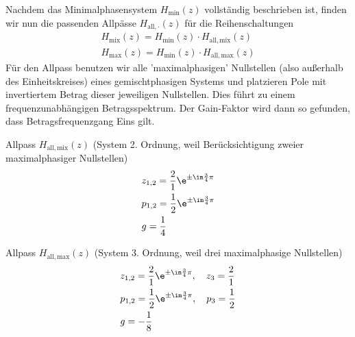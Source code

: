 \begin{ExCalc}
Nachdem das Minimalphasensystem $H_\mathrm{min}(z)$ vollständig beschrieben ist,
finden wir nun die
passenden Allpässe $H_\mathrm{all,\cdot}(z)$ für die Reihenschaltungen
\begin{align}
H_\mathrm{mix}(z) = H_\mathrm{min}(z) \cdot H_\mathrm{all,mix}(z)\\
H_\mathrm{max}(z) = H_\mathrm{min}(z) \cdot H_\mathrm{all,max}(z)
\end{align}
%
Für den Allpass benutzen wir alle 'maximalphasigen' Nullstellen (also außerhalb des
Einheitskreises) eines gemischtphasigen Systems und platzieren Pole mit invertiertem
Betrag dieser jeweiligen Nullstellen. Dies führt zu einem frequenzunabhängigen
Betragsspektrum. Der Gain-Faktor wird dann so gefunden, dass Betragsfrequenzgang
Eins gilt.
%

Allpass $H_\mathrm{all,mix}(z)$ (System 2. Ordnung, weil Berücksichtigung zweier
maximalphasiger Nullstellen)
\begin{align}
&z_{1,2} = \frac{2}{1} \e^{\pm\im\frac{3}{4}\pi}\\
&p_{1,2} = \frac{1}{2} \e^{\pm\im\frac{3}{4}\pi}\\
&g=\frac{1}{4}
\end{align}

Allpass $H_\mathrm{all,max}(z)$ (System 3. Ordnung, weil drei maximalphasige
Nullstellen)
\begin{align}
&z_{1,2} = \frac{2}{1} \e^{\pm\im\frac{3}{4}\pi},\quad z_3 = \frac{2}{1}\\
&p_{1,2} = \frac{1}{2} \e^{\pm\im\frac{3}{4}\pi},\quad p_3 = \frac{1}{2}\\
&g=-\frac{1}{8}
\end{align}
\end{ExCalc}
